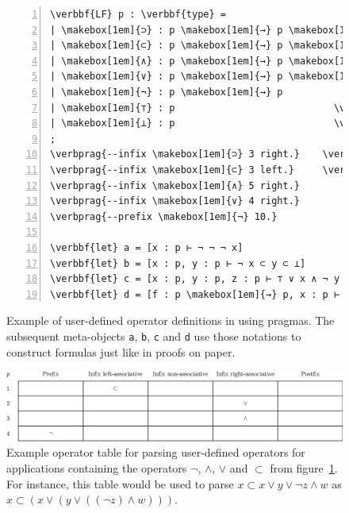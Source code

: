 \begin{figure}[H]
\begin{Verbatim}[commandchars=\\\{\}, baselinestretch=1, numbers=left]
\verbbf{LF} p : \verbbf{type} =
| \makebox[1em]{⊃} : p \makebox[1em]{→} p \makebox[1em]{→} p                  \verbcomment{% Logical implication}
| \makebox[1em]{⊂} : p \makebox[1em]{→} p \makebox[1em]{→} p                  \verbcomment{% Converse implication}
| \makebox[1em]{∧} : p \makebox[1em]{→} p \makebox[1em]{→} p                  \verbcomment{% Logical conjunction}
| \makebox[1em]{∨} : p \makebox[1em]{→} p \makebox[1em]{→} p                  \verbcomment{% Logical disjunction}
| \makebox[1em]{¬} : p \makebox[1em]{→} p                       \verbcomment{% Logical negation}
| \makebox[1em]{⊤} : p                            \verbcomment{% Tautology}
| \makebox[1em]{⊥} : p                            \verbcomment{% Contradiction}
;
\verbprag{--infix \makebox[1em]{⊃} 3 right.}    \verbcomment{% Subsequently treat ⊃ as a right-associative}
\verbprag{--infix \makebox[1em]{⊂} 3 left.}     \verbcomment{% infix operator with precedence value 3}
\verbprag{--infix \makebox[1em]{∧} 5 right.}
\verbprag{--infix \makebox[1em]{∨} 4 right.}
\verbprag{--prefix \makebox[1em]{¬} 10.}

\verbbf{let} a = [x : p ⊢ ¬ ¬ ¬ x]
\verbbf{let} b = [x : p, y : p ⊢ ¬ x ⊂ y ⊂ ⊥]
\verbbf{let} c = [x : p, y : p, z : p ⊢ ⊤ ∨ x ∧ ¬ y ⊃ ¬ z]
\verbbf{let} d = [f : p \makebox[1em]{→} p, x : p ⊢ ¬ f x ∨ f ⊥]
\end{Verbatim}
\caption[Example of user-defined operator definitions in \Beluga using pragmas.]{%
Example of user-defined operator definitions in \Beluga using pragmas.
The subsequent meta-objects \texttt{a}, \texttt{b}, \texttt{c} and \texttt{d} use those notations to construct formulas just like in proofs on paper.
}
\label{figure:operator-pragmas}
\end{figure}

\begin{figure}
\includegraphics[width=\textwidth]{figures/operator-table.eps}
\caption[Example operator table for parsing user-defined operators.]{%
Example operator table for parsing user-defined operators for applications containing the operators $\lnot$, $\land$, $\lor$ and $\subset$ from figure~\ref{figure:operator-pragmas}.
For instance, this table would be used to parse $x \subset x \lor y \lor \lnot z \land w$ as $x \subset (x \lor (y \lor ((\lnot z) \land w)))$.
}
\label{figure:operator-table}
\end{figure}

